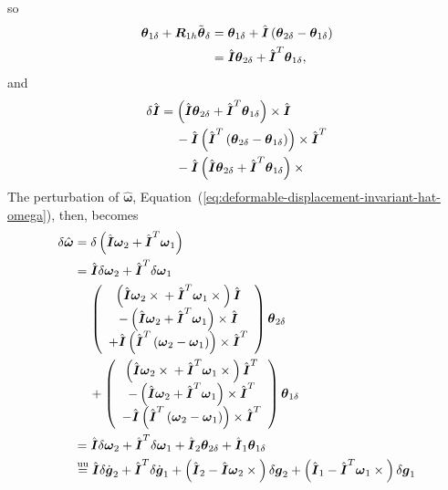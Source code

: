 \documentclass[10pt,dvips,fleqn]{report}
\newcommand{\T}[1]{\boldsymbol{#1}}
\newcommand{\equu}{\overset{\mathrm{uu}}{=}}
\begin{document}
so
\begin{align}
	\T{\theta}_{1\delta}
	+ \T{R}_{1h} \tilde{\T{\theta}}_{\delta}
	&= \T{\theta}_{1\delta} + \hat{\T{I}} \plbr{
		\T{\theta}_{2\delta} - \T{\theta}_{1\delta}
	} \\
	&= \hat{\T{I}} \T{\theta}_{2\delta}
	+ \hat{\T{I}}^T \T{\theta}_{1\delta} ,
\end{align}
and
\begin{align}
	\delta\hat{\T{I}} &= \plbr{
		\hat{\T{I}} \T{\theta}_{2\delta}
		+ \hat{\T{I}}^T \T{\theta}_{1\delta}
	} \times \hat{\T{I}}
	\nonumber \\
	& \mbox{\hspace{12pt}}
	- \hat{\T{I}} \plbr{
		\hat{\T{I}}^T \plbr{
			\T{\theta}_{2\delta}
			- \T{\theta}_{1\delta}
		}
	} \times \hat{\T{I}}^T
	\nonumber \\
	& \mbox{\hspace{12pt}}
	- \hat{\T{I}} \plbr{
		\hat{\T{I}} \T{\theta}_{2\delta}
		+ \hat{\T{I}}^T \T{\theta}_{1\delta}
	}\times{}
\end{align}
The perturbation of $\hat{\T{\omega}}$,
Equation~(\ref{eq:deformable-displacement-invariant-hat-omega}), then, 
becomes
\begin{align}
	\delta\hat{\T{\omega}} &= 
	\delta\plbr{
		\hat{\T{I}} \T{\omega}_2
		+ \hat{\T{I}}^T \T{\omega}_1
	} \\
	&= \hat{\T{I}} \delta\T{\omega}_2
		+ \hat{\T{I}}^T \delta\T{\omega}_1
	\nonumber \\
	&\mbox{\hspace{12pt}}
	\plbr{\cvvect{
		\plbr{
			\hat{\T{I}} \T{\omega}_2 \times{}
			+ \hat{\T{I}}^T \T{\omega}_1 \times{}
		} \hat{\T{I}} \\
		- \plbr{
			\hat{\T{I}} \T{\omega}_2 + \hat{\T{I}}^T \T{\omega}_1
		} \times \hat{\T{I}} \\
		+ \hat{\T{I}} \plbr{
			\hat{\T{I}}^T \plbr{
				\T{\omega}_2 - \T{\omega}_1
			}
		}\times \hat{\T{I}}^T
	}} \T{\theta}_{2\delta} \nonumber \\
	&\mbox{\hspace{12pt}}
	+ \plbr{\cvvect{
		\plbr{
			\hat{\T{I}} \T{\omega}_2 \times{}
			+ \hat{\T{I}}^T \T{\omega}_1 \times{}
		} \hat{\T{I}}^T \\
		- \plbr{
			\hat{\T{I}} \T{\omega}_2 + \hat{\T{I}}^T \T{\omega}_1
		} \times \hat{\T{I}}^T \\
		- \hat{\T{I}} \plbr{
			\hat{\T{I}}^T \plbr{
				\T{\omega}_2 - \T{\omega}_1
			}
		}\times \hat{\T{I}}^T
	}} \T{\theta}_{1\delta} \\
	&= \hat{\T{I}} \delta\T{\omega}_2
		+ \hat{\T{I}}^T \delta\T{\omega}_1
	+ \hat{\T{I}}_2 \T{\theta}_{2\delta}
	+ \hat{\T{I}}_1 \T{\theta}_{1\delta} \\
	&\equu
	\hat{\T{I}} \delta\dot{\T{g}}_2
		+ \hat{\T{I}}^T \delta\dot{\T{g}}_1
	+ \plbr{\hat{\T{I}}_2 - \hat{\T{I}} \T{\omega}_2\times{}}
		\delta\T{g}_2
	+ \plbr{\hat{\T{I}}_1 - \hat{\T{I}}^T \T{\omega}_1\times{}}
		\delta\T{g}_1
\end{align}
\end{document}
